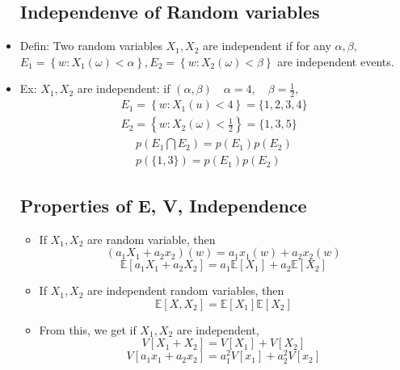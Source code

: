 \begin{itemize}
\subsection{Independenve of Random variables}
\item Defin:  Two random variables $X_{1},X_{2}$ are independent if for any $ \alpha, \beta,$
$E_{1}=\left\{w: X_{1}(\omega)<\alpha\right\}, E_{2}=\left\{w: X_{2}(\omega)<\beta\right\}$ are independent events.
\item Ex: $X_{1} , X_{2}$ are independent: if $(\alpha, \beta) \quad \alpha=4, \quad \beta=\frac{1}{2}$,
$$
\begin{array}{l} 
E_{1}=\left\{w: X_{1}(u)<4\right\}=\{1,2,3,4\} \\
E_{2}=\left\{w: X_{2}(\omega)<\frac{1}{2}\right\}=\{1,3,5\}
\end{array}
$$
$$
\begin{array}{l}
p\left(E_{1}\bigcap E_{2}\right)=p\left(E_{1}\right) p\left(E_{2}\right) \\
p(\{1,3\})=p\left(E_{1}\right) p\left(E_{2}\right)
\end{array}
$$

\subsection{Properties of E, V, Independence} 
\begin{itemize}
	\item If $X_{1}, X_{2}$ are random variable, then 
	$$
	\left(a_{1}X_{1}+a_{2} x_{2}\right)(w)=a_{1} x_{1}(w)+a_{2} x_{2}(w)
	$$
	$$\mathbb{E}\left[a_{1}X_{1}+a_{2} X_{2}\right]=a_{1}\mathbb{E}\left[X_{1}\right]+a_{2} \mathbb{E}\left[X_{2}\right]
	$$
	\item If $X_{1}, X_{2}$ are independent random variables, then 
	$$
	\mathbb{E}\left[X, X_{2}\right]=\mathbb{E}\left[X_{1}\right] \mathbb{E}\left[X_{2}\right]
	$$
	\item From this, we get if $X_{1}, X_{2}$ are independent,  	
	$$
	V\left[X_{1}+X_{2}\right]=V\left[X_{1}\right]+V\left[X_{2}\right]
	$$
	$$V\left[a_{1} x_{1}+a_{2} x_{2}\right]=a_{1}^{2} V\left[x_{1}\right]+a_{2}^{2} V\left[x_{2}\right]
	$$
\end{itemize}	

\end{itemize}

%
%
%
%
%
%
%
%
%
%

